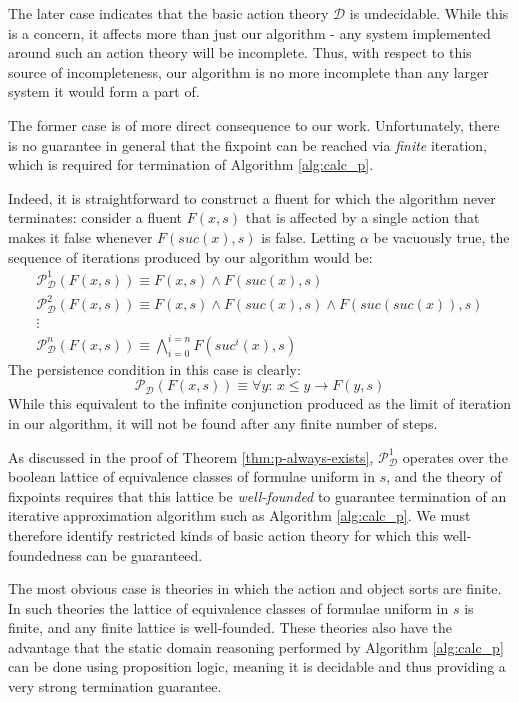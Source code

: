 The later case indicates that the basic action theory $\mathcal{D}$
is undecidable. While this is a concern, it affects more than just
our algorithm - any system implemented around such an action theory
will be incomplete. Thus, with respect to this source of incompleteness,
our algorithm is no more incomplete than any larger system it would
form a part of.

The former case is of more direct consequence to our work. Unfortunately,
there is no guarantee in general that the fixpoint can be reached
via \emph{finite} iteration, which is required for termination of
Algorithm \ref{alg:calc_p}.

Indeed, it is straightforward to construct a fluent for which the
algorithm never terminates: consider a fluent $F(x,s)$ that is affected
by a single action that makes it false whenever $F(suc(x),s)$ is
false. Letting $\alpha$ be vacuously true, the sequence of iterations
produced by our algorithm would be:\begin{gather*}
\mathcal{P}_{\mathcal{D}}^{1}(F(x,s))\equiv F(x,s)\wedge F(suc(x),s)\\
\mathcal{P}_{\mathcal{D}}^{2}(F(x,s))\equiv F(x,s)\wedge F(suc(x),s)\wedge F(suc(suc(x)),s)\\
\vdots\\
\mathcal{P}_{\mathcal{D}}^{n}(F(x,s))\equiv\bigwedge_{i=0}^{i=n}F(suc^{i}(x),s)\end{gather*}
 The persistence condition in this case is clearly: \[
\mathcal{P}_{\mathcal{D}}(F(x,s))\equiv\forall y:\, x\leq y\rightarrow F(y,s)\]
 While this equivalent to the infinite conjunction produced as the
limit of iteration in our algorithm, it will not be found after any
finite number of steps.

As discussed in the proof of Theorem \ref{thm:p-always-exists}, $\mathcal{P}_{\mathcal{D}}^{1}$
operates over the boolean lattice of equivalence classes of formulae
uniform in $s$, and the theory of fixpoints requires that this lattice
be \emph{well-founded} to guarantee termination of an iterative approximation
algorithm such as Algorithm \ref{alg:calc_p}. We must therefore identify
restricted kinds of basic action theory for which this well-foundedness
can be guaranteed.

The most obvious case is theories in which the action and object sorts
are finite. In such theories the lattice of equivalence classes of
formulae uniform in $s$ is finite, and any finite lattice is well-founded.
These theories also have the advantage that the static domain reasoning
performed by Algorithm \ref{alg:calc_p} can be done using proposition
logic, meaning it is decidable and thus providing a very strong termination
guarantee.

